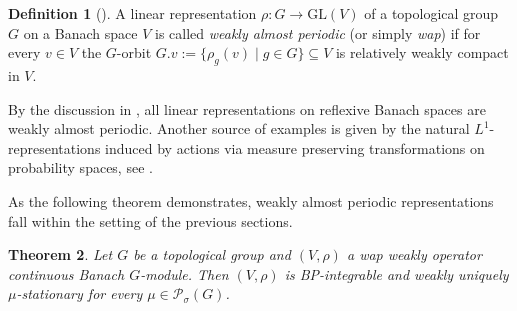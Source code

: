 \documentclass[a4paper,11pt,reqno]{amsart}
\numberwithin{equation}{section}
\newtheorem{theorem}{Theorem}[section]
\theoremstyle{definition}
\newtheorem{definition}[theorem]{Definition}
\theoremstyle{remark}
\theoremstyle{remark}
\begin{document}
\begin{definition}[{\cite[Definition 1]{BaderRosendalSauer}}] A linear representation $\rho:G\rightarrow\text{GL}(V)$ of a topological group $G$ on a Banach space $V$ is called \emph{weakly almost periodic} (or simply \emph{wap}) if for every $v\in V$ the $G$-orbit $G.v:=\{\rho_{g}(v)\mid g\in G\}\subseteq V$ is relatively weakly compact in $V$. \end{definition}

By the discussion in \cite{BaderRosendalSauer}, all linear representations on reflexive Banach spaces are weakly almost periodic. Another source of examples is given by the natural $L^{1}$-representations induced by actions via measure preserving transformations on probability spaces, see \cite[Example 10]{BaderRosendalSauer}.

As the following theorem demonstrates, weakly almost periodic representations fall within the setting of the previous sections.

\begin{theorem} \label{WeaklyAlmostPeriodicSetting} Let $G$ be a topological group and $(V,\rho)$ a wap weakly operator continuous Banach $G$-module. Then $(V,\rho)$ is BP-integrable and weakly uniquely $\mu$-stationary for every $\mu\in\mathcal{P}_{\sigma}(G)$. \end{theorem}
\end{document}
